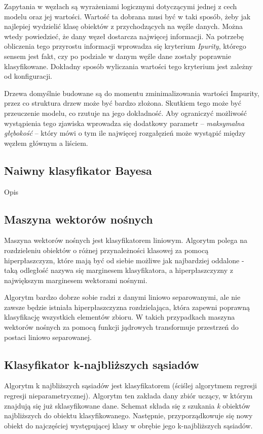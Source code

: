 \documentclass[a4paper,11pt]{article}
\begin{document}
Zapytania w węzłach są wyrażeniami logicznymi dotyczącymi jednej z cech modelu oraz jej wartości. Wartość ta dobrana musi być w taki sposób, żeby jak najlepiej wydzielić klasę obiektów z przychodzących na węźle danych. Można wtedy powiedzieć, że dany węzeł dostarcza najwięcej informacji. Na potrzebę obliczenia tego przyrostu informacji wprowadza się kryterium \textit{Ipurity}, którego sensem jest fakt, czy po podziale w danym węźle dane zostały poprawnie klasyfikowane. Dokładny sposób wyliczania wartości tego kryterium jest zależny od konfiguracji.
\par
Drzewa domyślnie budowane są do momentu zminimalizowania wartości Impurity, przez co struktura drzew może być bardzo złożona. Skutkiem tego może być przeuczenie modelu, co rzutuje na jego dokładność. Aby ograniczyć możliwość wystąpienia tego zjawiska wprowadza się dodatkowy parametr --  \textit{maksymalna głębokość} -- który mówi o tym ile najwięcej rozgałęzień może wystąpić między węzłem głównym a liściem.

\subsection{Naiwny klasyfikator Bayesa}
Opis

\subsection{Maszyna wektorów nośnych}
Maszyna wektorów nośnych jest klasyfikatorem liniowym. Algorytm polega na rozdzieleniu obiektów o różnej przynależności klasowej za pomocą hiperpłaszczyzn, które mają być od siebie możliwe jak najbardziej oddalone - taką odległość nazywa się marginesem klasyfikatora, a hiperpłaszczyzny z największym marginesem wektorami nośnymi. 

Algorytm bardzo dobrze sobie radzi z danymi liniowo separowanymi, ale nie zawsze będzie istniała hiperpłaszczyzna rozdzielająca, która zapewni poprawną klasyfikację wszystkich elementów zbioru. W takich przypadkach maszyna wektorów nośnych za pomocą funkcji jądrowych transformuje przestrzeń do postaci liniowo separowanej.

\subsection{Klasyfikator k-najbliższych sąsiadów}
Algorytm k najbliższych sąsiadów jest klasyfikatorem (ściślej algorytmem regresji regresji nieparametrycznej). Algorytm ten zakłada dany zbiór uczący, w którym znajdują się już sklasyfikowane dane. Schemat składa się z szukania \textit{k} obiektów najbliższych do obiektu klasyfikowanego. Następnie, przyporządkowuje się nowy obiekt do najczęściej występującej klasy w obrębie jego k-najbliższych sąsiadów.\\
\end{document}
